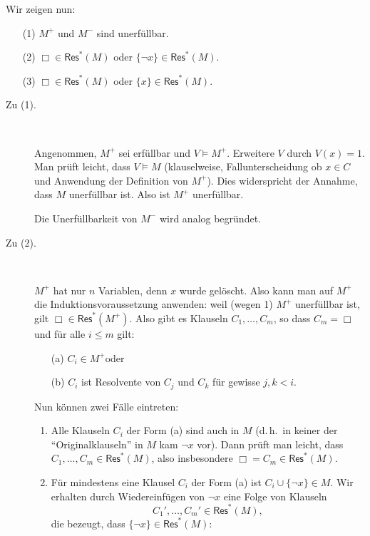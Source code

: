 \documentclass[fontsize=11pt, twoside=false, numbers=autoenddot]{scrbook}
\begin{document}
\begin{beweis}
\begin{description}
\begin{description}
          Wir zeigen nun:
          \begin{enumerate}
            \item[(1)]
              $M^+$ und $M^-$ sind unerfüllbar.
            \item[(2)]
              $\Box \in \textsf{Res}^*(M)$ oder $\{\lnot x\} \in \textsf{Res}^*(M)$.
            \item[(3)]
              $\Box \in \textsf{Res}^*(M)$ oder $\{x\} \in \textsf{Res}^*(M)$.
          \end{enumerate}
          \begin{description}
            \item[\textnormal{Zu (1).}]
              ~\par
              Angenommen, $M^+$ sei erfüllbar und $V \models M^+$.
              Erweitere $V$ durch $V(x) = 1$.
              Man prüft leicht, dass $V \models M$ (klauselweise, Fallunterscheidung ob 
              $x \in C$ und Anwendung der Definition von $M^+$).
              Dies widerspricht der Annahme, dass $M$ unerfüllbar ist.
              Also ist $M^+$ unerfüllbar.

              Die Unerfüllbarkeit von $M^-$ wird analog begründet.
            \item[\textnormal{Zu (2).}]
              ~\par
              $M^+$ hat nur $n$ Variablen, denn $x$ wurde gelöscht.
              Also kann man auf $M^+$ die Induktionsvoraussetzung anwenden:
              weil (wegen 1) $M^+$ unerfüllbar ist,
              gilt $\Box \in \textsf{Res}^*(M^+)$.
              Also gibt es Klauseln $C_1,\dots,C_m$, so dass $C_m = \Box$ 
              und für alle $i \leq m$ gilt:
              \begin{enumerate}
                \item[(a)]
                  $C_i \in M^+$\quad oder
                \item[(b)]
                  $C_i$ ist Resolvente von $C_j$ und $C_k$ für gewisse $j,k < i$.
              \end{enumerate}
              Nun können zwei Fälle eintreten:
              \begin{enumerate}
                \item
                  Alle Klauseln $C_i$ der Form (a) sind auch in $M$
                  (d.\,h.\ in keiner der "`Originalklauseln"' in $M$ kam $\lnot x$ vor).
                  Dann prüft man leicht, dass $C_1, \dots, C_m \in \textsf{Res}^*(M)$,
                  also insbesondere $\Box = C_m \in \textsf{Res}^*(M)$.
                \item
                  Für mindestens eine Klausel $C_i$ der Form (a) ist $C_i \cup \{\lnot x\} \in M$.
                  Wir erhalten durch Wiedereinfügen von $\lnot x$ eine Folge von Klauseln
                  \[
                    C_1',\dots,C_m' \in \textsf{Res}^*(M),
                  \]
                  die bezeugt, dass $\{\lnot x\} \in \textsf{Res}^*(M)$:


\end{enumerate}
\end{description}
\end{description}
\end{description}
\end{beweis}
\end{document}
